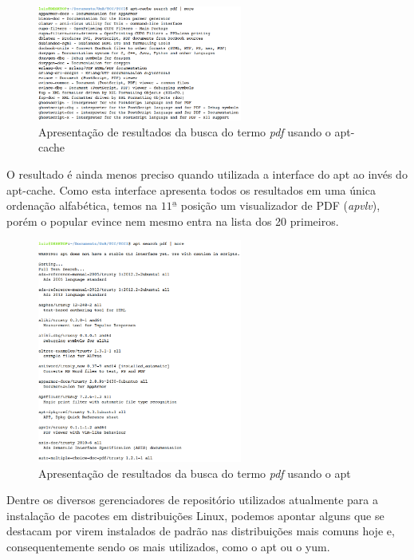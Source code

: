 \begin{figure}[h]
  \centering
	\includegraphics[width=0.6\textwidth]{figuras/search_pdf}
  \caption{Apresentação de resultados da busca do termo \textit{pdf} usando o {\code apt-cache}}
  \label{fig:figuras_search_pdf}
\end{figure}

O resultado é ainda menos preciso quando utilizada a interface do {\code apt} ao invés do {\code apt-cache}. Como esta interface apresenta todos os resultados em uma única ordenação alfabética, temos na $11ª$ posição um visualizador de PDF (\textit{apvlv}), porém o popular {\code evince} nem mesmo entra na lista dos 20 primeiros.

\begin{figure}[h]
  \centering
	\includegraphics[width=0.6\textwidth]{figuras/search_pdf_ii}
  \caption{Apresentação de resultados da busca do termo \textit{pdf} usando o {\code apt}}
  \label{fig:figuras_search_pdf_ii}
\end{figure}


Dentre os diversos gerenciadores de repositório utilizados atualmente para a instalação de pacotes em distribuições Linux, podemos apontar alguns que se destacam por virem instalados de padrão nas distribuições mais comuns hoje e, consequentemente sendo os mais  utilizados, como o {\code apt} ou o {\code yum}.


